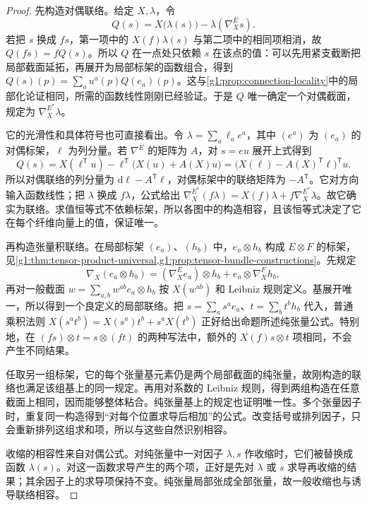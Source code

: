 \begin{proof}
	先构造对偶联络。给定 \(X,\lambda\)，令
	\[
		Q(s)=X\bigl(\lambda(s)\bigr)-\lambda(\nabla^E_Xs).
	\]
	若把 \(s\) 换成 \(fs\)，第一项中的 \(X(f)\lambda(s)\) 与第二项中的相同项相消，故 \(Q(fs)=fQ(s)\)。所以 \(Q\) 在一点处只依赖 \(s\) 在该点的值：可以先用紧支截断把局部截面延拓，再展开为局部标架的函数组合，得到 \(Q(s)(p)=\sum_a u^a(p)Q(e_a)(p)\)。这与\cref{g1:prop:connection-locality}中的局部化论证相同，所需的函数线性刚刚已经验证。于是 \(Q\) 唯一确定一个对偶截面，规定为 \(\nabla^{E^*}_X\lambda\)。

	它的光滑性和具体符号也可直接看出。令 \(\lambda=\sum_a\ell_a e^a\)，其中 \((e^a)\) 为 \((e_a)\) 的对偶标架，\(\ell\) 为列分量。若 \(\nabla^E\) 的矩阵为 \(A\)，对 \(s=e u\) 展开上式得到
	\[
		Q(s)=X(\ell^{\mathsf T}u)-\ell^{\mathsf T}\bigl(X(u)+A(X)u\bigr)
		=\bigl(X(\ell)-A(X)^{\mathsf T}\ell\bigr)^{\mathsf T}u.
	\]
	所以对偶联络的列分量为 \(\mathrm{d}\ell-A^{\mathsf T}\ell\)，对偶标架中的联络矩阵为 \(-A^{\mathsf T}\)。它对方向输入函数线性；把 \(\lambda\) 换成 \(f\lambda\)，公式给出 \(\nabla^{E^*}_X(f\lambda)=X(f)\lambda+f\nabla^{E^*}_X\lambda\)。故它确实为联络。求值恒等式不依赖标架，所以各图中的构造相容，且该恒等式决定了它在每个纤维向量上的值，保证唯一。

	再构造张量积联络。在局部标架 \((e_a)\)、\((h_b)\) 中，\(e_a\otimes h_b\) 构成 \(E\otimes F\) 的标架，见\cref{g1:thm:tensor-product-universal,g1:prop:tensor-bundle-constructions}。先规定
	\[
		\nabla_X(e_a\otimes h_b)
		=(\nabla^E_Xe_a)\otimes h_b+e_a\otimes\nabla^F_Xh_b,
	\]
	再对一般截面 \(w=\sum_{a,b}w^{ab}e_a\otimes h_b\) 按 \(X(w^{ab})\) 和 Leibniz 规则定义。基展开唯一，所以得到一个良定义的局部联络。把 \(s=\sum_a s^a e_a\)、\(t=\sum_b t^b h_b\) 代入，普通乘积法则 \(X(s^at^b)=X(s^a)t^b+s^aX(t^b)\) 正好给出命题所述纯张量公式。特别地，在 \((fs)\otimes t=s\otimes(ft)\) 的两种写法中，额外的 \(X(f)s\otimes t\) 项相同，不会产生不同结果。

	任取另一组标架，它的每个张量基元素仍是两个局部截面的纯张量，故刚构造的联络也满足该组基上的同一规定。再用对系数的 Leibniz 规则，得到两组构造在任意截面上相同，因而能够整体粘合。纯张量基上的规定也证明唯一性。多个张量因子时，重复同一构造得到“对每个位置求导后相加”的公式。改变括号或排列因子，只会重新排列这组求和项，所以与这些自然识别相容。

	收缩的相容性来自对偶公式。对纯张量中一对因子 \(\lambda,s\) 作收缩时，它们被替换成函数 \(\lambda(s)\)。对这一函数求导产生的两个项，正好是先对 \(\lambda\) 或 \(s\) 求导再收缩的结果；其余因子上的求导项保持不变。纯张量局部张成全部张量，故一般收缩也与诱导联络相容。


\end{proof}
